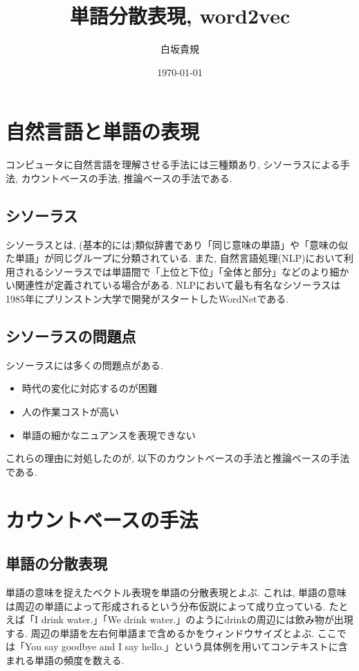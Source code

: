 \documentclass[twocolumn]{jarticle}
\title{単語分散表現, word2vec}
\author{白坂貴規}
\date{\today}
\begin{document}
\maketitle

\section{自然言語と単語の表現}
コンピュータに自然言語を理解させる手法には三種類あり, シソーラスによる手法, カウントベースの手法, 推論ベースの手法である.

\subsection{シソーラス}
シソーラスとは, (基本的には)類似辞書であり「同じ意味の単語」や「意味の似た単語」が同じグループに分類されている. また, 自然言語処理(NLP)において利用されるシソーラスでは単語間で「上位と下位」「全体と部分」などのより細かい関連性が定義されている場合がある. NLPにおいて最も有名なシソーラスは1985年にプリンストン大学で開発がスタートしたWordNetである.

\subsection{シソーラスの問題点}
シソーラスには多くの問題点がある.
\begin{itemize}
  \item 時代の変化に対応するのが困難
  \item 人の作業コストが高い
  \item 単語の細かなニュアンスを表現できない
\end{itemize}
これらの理由に対処したのが, 以下のカウントベースの手法と推論ベースの手法である.

\section{カウントベースの手法}

\subsection{単語の分散表現}
単語の意味を捉えたベクトル表現を単語の分散表現とよぶ. これは, 単語の意味は周辺の単語によって形成されるという分布仮説によって成り立っている. たとえば「I drink water.」「We drink water.」のようにdrinkの周辺には飲み物が出現する. 周辺の単語を左右何単語まで含めるかをウィンドウサイズとよぶ. ここでは「You say goodbye and I say hello.」という具体例を用いてコンテキストに含まれる単語の頻度を数える.
\end{document}
